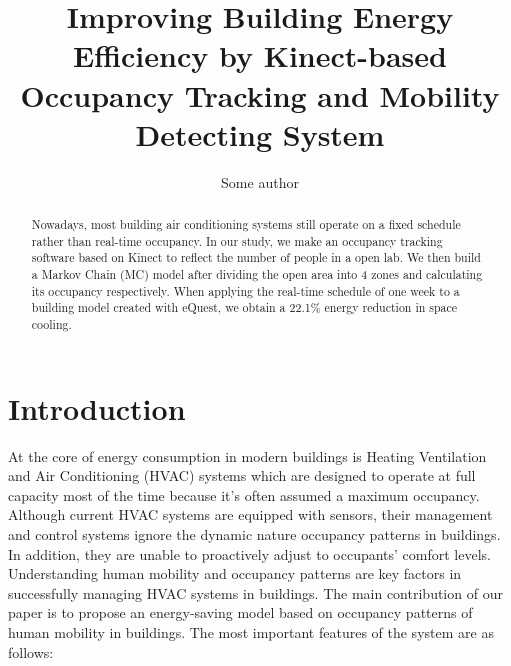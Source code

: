 \documentclass{sig-alternate}
\begin{document}
\title{Improving Building Energy Efficiency by Kinect-based Occupancy
  Tracking and Mobility Detecting System}


\author{
\alignauthor
Some author
}


\maketitle{}



\begin{abstract}
  Nowadays, most building air conditioning systems still operate on a
  fixed schedule rather than real-time occupancy. In our study, we
  make an occupancy tracking software based on Kinect to reflect the
  number of people in a open lab. We then build a Markov Chain (MC)
  model after dividing the open area into 4 zones and calculating its
  occupancy respectively. When applying the real-time schedule of one
  week to a building model created with eQuest, we obtain a 22.1\%
  energy reduction in space cooling.
\end{abstract}











\section{Introduction}
\label{sec:introduction}
At the core of energy consumption in modern buildings is Heating Ventilation
and Air Conditioning (HVAC) systems which are designed to operate at
full capacity most of the time because it's often assumed a maximum
occupancy. Although current HVAC systems are
equipped with sensors, their management and control systems ignore the dynamic nature
occupancy patterns in buildings. In addition, they are unable to
proactively adjust to occupants' comfort levels. Understanding human mobility
and occupancy patterns are key factors in successfully managing HVAC systems
in buildings. The main contribution of our paper is
to propose an energy-saving model based on occupancy patterns of human
mobility in buildings. The most important features of the system are as follows:
\end{document}
